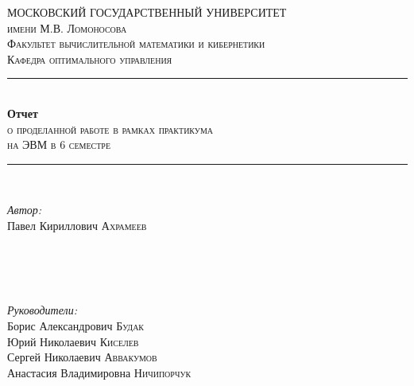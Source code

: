 \begin{titlepage}

\newcommand{\HRule}{\rule{\linewidth}{0.5mm}} %

\center %
 

\textsc{\LARGE МОСКОВСКИЙ ГОСУДАРСТВЕННЫЙ УНИВЕРСИТЕТ}\\[0.2cm] %
\textsc{\LARGE имени М.В. Ломоносова}\\[0.5cm] %
\textsc{\Large Факультет вычислительной математики и кибернетики}\\[0.5cm] %
\textsc{\large Кафедра оптимального управления}\\[2.5cm] %


\HRule \\[0.4cm]
{ \huge \bfseries Отчет}\\[0.2cm] %
\textsc{о проделанной работе в рамках практикума\\на ЭВМ в 6 семестре}
\HRule \\[1.5cm]
 

\begin{minipage}{0.3\textwidth}
\begin{flushleft} 
\emph{Автор:}\\
Павел Кириллович \textsc{Ахрамеев}\\ %
\textsc{}\\
\textsc{}\\
\end{flushleft}
\end{minipage}
~
\begin{minipage}{0.6\textwidth}
\begin{flushright} 
\emph{Руководители:} \\
Борис Александрович \textsc{Будак}\\ %
Юрий Николаевич \textsc{Киселев}\\ %
Сергей Николаевич \textsc{Аввакумов}\\ %
Анастасия Владимировна \textsc{Ничипорчук}\\ %
\end{flushright}
\end{minipage}\\[4cm]


\end{titlepage}
